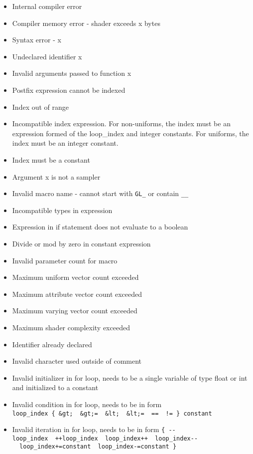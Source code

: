 \begin{itemize}
\tightlist
\item
  Internal compiler error
\item
  Compiler memory error - shader exceeds x bytes
\item
  Syntax error - x
\item
  Undeclared identifier x
\item
  Invalid arguments passed to function x
\item
  Postfix expression cannot be indexed
\item
  Index out of range
\item
  Incompatible index expression. For non-uniforms, the index must be an
  expression formed of the loop\_index and integer constants. For
  uniforms, the index must be an integer constant.
\item
  Index must be a constant
\item
  Argument x is not a sampler
\item
  Invalid macro name - cannot start with \texttt{GL\_} or contain
  \texttt{\_\_}
\item
  Incompatible types in expression
\item
  Expression in if statement does not evaluate to a boolean
\item
  Divide or mod by zero in constant expression
\item
  Invalid parameter count for macro
\item
  Maximum uniform vector count exceeded
\item
  Maximum attribute vector count exceeded
\item
  Maximum varying vector count exceeded
\item
  Maximum shader complexity exceeded
\item
  Identifier already declared
\item
  Invalid character used outside of comment
\item
  Invalid initializer in for loop, needs to be a single variable of type
  float or int and initialized to a constant
\item
  Invalid condition in for loop, needs to be in form
  \texttt{loop\_index\ \{\ \&gt;\ \textbar{}\ \&gt;=\ \textbar{}\ \&lt;\ \textbar{}\ \&lt;=\ \textbar{}\ ==\ \textbar{}\ !=\ \}\ constant}
\item
  Invalid iteration in for loop, needs to be in form
  \texttt{\{\ -\/-loop\_index\ \textbar{}\ ++loop\_index\ \textbar{}\ loop\_index++\ \textbar{}\ loop\_index-\/-\ \textbar{}\ loop\_index+=constant\ \textbar{}\ loop\_index-=constant\ \}}

\end{itemize}
